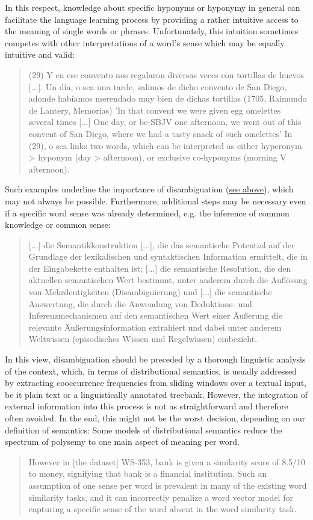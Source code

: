 \documentclass[jou]{apa6} %
\begin{document}
In this respect, knowledge about specific hyponyms or hyponymy in general can facilitate the language learning process by providing a rather intuitive access to the meaning of single words or phrases. Unfortunately, this intuition sometimes competes with other interpretations of a word's sense which may be equally intuitive and valid:
\blockquote[{\cite[p.~126]{ponsborderiaPathsGrammaticalizationSpanish2014}}]{(29) Y en ese convento nos regalaron diversas veces con tortillas de huevos [...]. Un día, o sea una tarde, salimos de dicho convento de San Diego, adonde habíamos merendado muy bien de dichas tortillas (1705, Raimundo de Lantery, Memorias)
'In that convent we were given egg omelettes several times [...] One day, or be-SBJV one afternoon, we went out of this convent of San Diego, where we had a tasty snack of such omelettes'
In (29), o sea links two words, which can be interpreted as either hyperonym > hyponym (day > afternoon), or exclusive co-hyponyms (morning V afternoon).}
Such examples underline the importance of disambiguation (\hyperref[polysemyProblemForSemanticRelations]{see above}), which may not always be possible. Furthermore, additional steps may be necessary even if a specific word sense was already determined, e.g. the inference of common knowledge or common sense:
\blockquote[{\cite[p.~427f.]{pinkalSemantik1993}}]{[...] die Semantikkonstruktion [...], die das semantische Potential auf der Grundlage der lexikalischen und syntaktischen Information ermittelt, die in der Eingabekette enthalten ist; [...] die semantische Resolution, die den aktuellen semantischen Wert bestimmt, unter anderem durch die Auflösung von Mehrdeutigkeiten (Disambiguierung) und [...] die semantische Auswertung, die durch die Anwendung von Deduktions- und Inferenzmechanismen auf den semantischen Wert einer Äußerung die relevante Äußerungsinformation extrahiert und dabei unter anderem Weltwissen (episodisches Wissen und Regelwissen) einbezieht.}
In this view, disambiguation should be preceded by a thorough linguistic analysis of the context, which, in terms of distributional semantics, is usually addressed by extracting cooccurrence frequencies from sliding windows over a textual input, be it plain text or a linguistically annotated treebank. However, the integration of external information into this process is not as straightforward and therefore often avoided. In the end, this might not be the worst decision, depending on our definition of semantics: Some models of distributional semantics reduce the spectrum of polysemy to one main aspect of meaning per word.
\blockquote[{\cite[p.~4]{faruquiProblemsEvaluationWord2016}}]{However in [the dataset] WS-353, bank is given a similarity score of 8.5/10 to money, signifying that bank is a financial institution. Such an assumption of one sense per word is prevalent in many of the existing word similarity tasks, and it can incorrectly penalize a word vector model for capturing a specific sense of the word absent in the word similarity task.}
\end{document}
